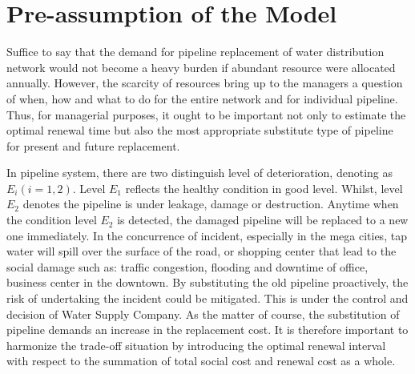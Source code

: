 \section{Pre-assumption of the Model}
\label{53}
Suffice to say that the demand for pipeline replacement of water distribution network would not become a heavy burden if abundant resource were allocated annually. However, the scarcity of resources bring up to the managers a question of when, how and what to do for the entire network and for individual pipeline. Thus, for managerial purposes, it ought to be important not only to estimate the optimal renewal time but also the most appropriate substitute type of pipeline for present and future replacement. 

In pipeline system, there are two distinguish level of deterioration, denoting as $E_i (i=1,2)$. Level $E_1$ reflects the healthy condition in good level. Whilst, level $E_2$ denotes the pipeline is under leakage, damage or destruction. Anytime when the condition level $E_2$ is detected, the damaged pipeline will be replaced to a new one immediately. In the concurrence of incident, especially in the mega cities, tap water will spill over the surface of the road, or shopping center that lead to the social damage such as: traffic congestion, flooding and downtime of office, business center in the downtown. By substituting the old pipeline proactively, the risk of undertaking the incident could be mitigated. This is under the control and decision of Water Supply Company. As the matter of course, the substitution of pipeline demands an increase in the replacement cost. It is therefore important to harmonize the trade-off situation by introducing the optimal renewal interval with respect to the summation of total social cost and renewal cost as a whole.
